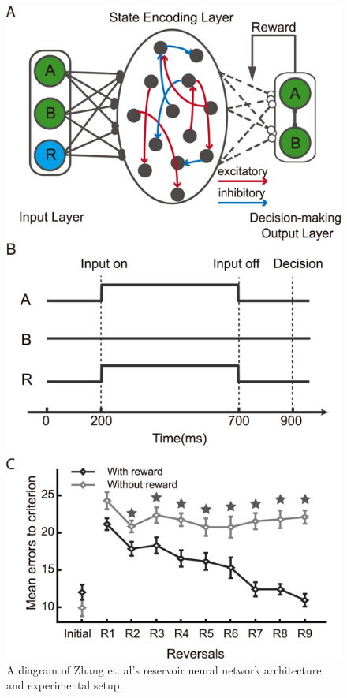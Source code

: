 \documentclass[11pt]{article}
\makeatletter
\def\maxwidth{\ifdim\Gin@nat@width>\linewidth\linewidth
    \else\Gin@nat@width\fi}
\let\Oldincludegraphics\includegraphics
\renewcommand{\includegraphics}[1]{\Oldincludegraphics[width=.8\maxwidth]{#1}}
\makeatother
\begin{document}
\begin{figure}
\centering
\includegraphics{journal.pcbi.1005925.g001.PNG}
\caption{A diagram of Zhang et. al's reservoir neural network architecture and experimental setup.}
\end{figure}
\end{document}
